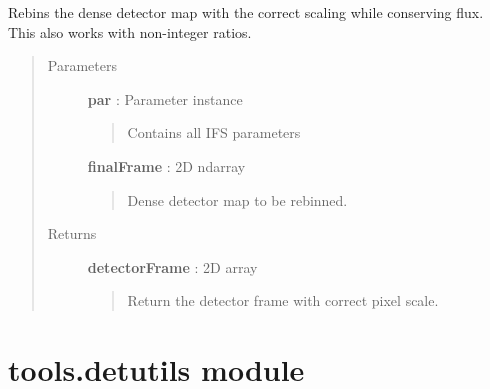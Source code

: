 \documentclass[letterpaper,10pt,english]{sphinxmanual}
\begin{document}
\begin{fulllineitems}
\label{tools:tools.detector.rebinDetector}
Rebins the dense detector map with the correct scaling while conserving flux.
This also works with non-integer ratios.
\begin{quote}\begin{description}
\item[{Parameters}] \leavevmode
\textbf{par} :   Parameter instance
\begin{quote}

Contains all IFS parameters
\end{quote}

\textbf{finalFrame} : 2D ndarray
\begin{quote}

Dense detector map to be rebinned.
\end{quote}

\item[{Returns}] \leavevmode
\textbf{detectorFrame} : 2D array
\begin{quote}

Return the detector frame with correct pixel scale.
\end{quote}

\end{description}\end{quote}

\end{fulllineitems}



\section{tools.detutils module}
\label{tools:tools-detutils-module}\label{tools:module-tools.detutils}
\end{document}
